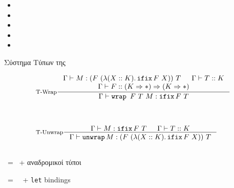 \documentclass[10pt]{beamer}
\begin{document}
\begin{frame}{\FOM}

    \begin{itemize}[<+->]
    \item[] {}

    \item[]

    \item[]

    \item[]

   \item[]
    \end{itemize}

\end{frame}

\begin{frame}{Σύστημα Τύπων της \FOMF}

 \begin{displaymath}
    \begin{array}{ll}
   \multicolumn{2}{l}{\inference[T-Wrap]{\Gamma |- M: (F ~( \lambda (X :: K). \ifix F ~X)) ~T & \Gamma |- T:: K \\ \Gamma |- F :: (K\kindArrow\Type)\kindArrow (K\kindArrow\Type)}
            {\Gamma |- \wrap ~ F ~ T ~ M : \ifix F ~T}  }\\
    \\ \\ \\ 
    \multicolumn{2}{l}{\inference[T-Unwrap]{\Gamma |- M : \ifix F ~T & \Gamma |- T :: K }
            {\Gamma |- \unwrap M : (F ~( \lambda (X :: K). \ifix F ~X)) ~T  }  }\\
    \\
     \end{array}
    \end{displaymath}
\end{frame}

\begin{frame}{\FOMF}


\FOMF ~= ~\FOM + αναδρομικοί τύποι

\FIR ~= ~\FOMF ~+ \texttt{let} bindings

\end{frame}
\end{document}
